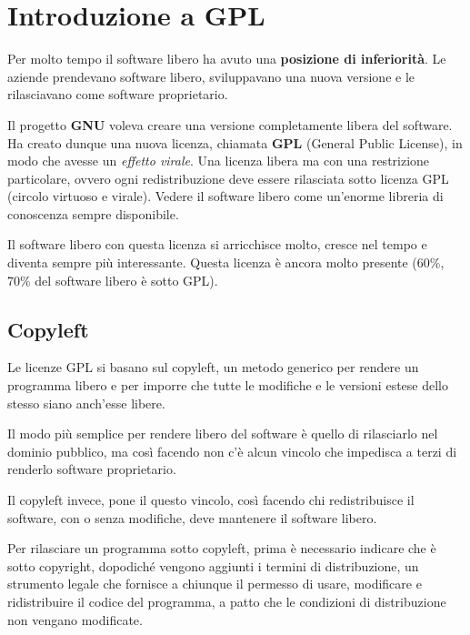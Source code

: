 \section{Introduzione a GPL}

Per molto tempo il software libero ha avuto una \textbf{posizione di inferiorità}. Le aziende prendevano software libero, sviluppavano una nuova versione e le rilasciavano come software proprietario. 

Il progetto \textbf{GNU} voleva creare una versione completamente libera del software. Ha creato dunque una nuova licenza, chiamata \textbf{GPL} (General Public License), in modo che avesse un \textit{effetto virale}. Una licenza libera ma con una restrizione particolare, ovvero ogni redistribuzione deve essere rilasciata sotto licenza GPL (circolo virtuoso e virale). Vedere il software libero come un'enorme libreria di conoscenza sempre disponibile.

Il software libero con questa licenza si arricchisce molto, cresce nel tempo e diventa sempre più interessante. Questa licenza è ancora molto presente (60\%, 70\% del software libero è sotto GPL).

\subsection{Copyleft}

Le licenze GPL si basano sul copyleft, un metodo generico per rendere un programma libero e per imporre che tutte le modifiche e le versioni estese dello stesso siano anch'esse libere.

Il modo più semplice per rendere libero del software è quello di rilasciarlo nel dominio pubblico, ma così facendo non c'è alcun vincolo che impedisca a terzi di renderlo software proprietario.

Il copyleft invece, pone il questo vincolo, così facendo chi redistribuisce il software, con o senza modifiche, deve mantenere il software libero.

Per rilasciare un programma sotto copyleft, prima è necessario indicare che è sotto copyright, dopodiché vengono aggiunti i termini di distribuzione, un strumento legale che fornisce a chiunque il permesso di usare, modificare e ridistribuire il codice del programma, a patto che le condizioni di distribuzione non vengano modificate.